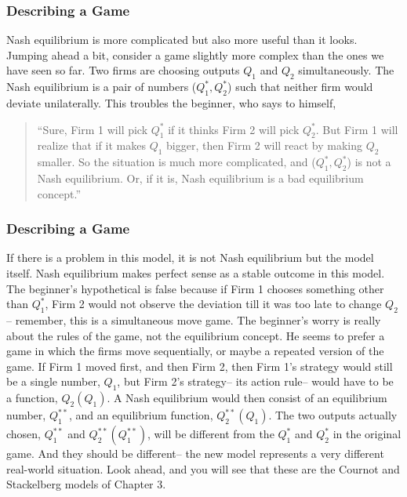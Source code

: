  \begin{frame}[fragile]\frametitle{Describing a Game}
Nash equilibrium  is more complicated  but also more useful than  it looks.
Jumping ahead a bit, consider a game slightly more complex than the ones we have
seen so far.  Two firms are choosing outputs $Q_1$ and  $Q_2$  simultaneously.
The Nash equilibrium is a pair of numbers ($Q_1^*, Q_2^*$) such that neither
firm would deviate unilaterally. This troubles the beginner, who says to
himself, \begin{small} \begin{quotation}
 ``Sure, Firm 1  will pick  $Q_1^*$  if it thinks Firm 2 will pick
$Q_2^*$. But Firm 1  will realize that  if it makes  $Q_1$  bigger, then Firm 2
will react by making  $Q_2$  smaller.  So the situation is much more
complicated, and  ($Q_1^*, Q_2^*$) is not a Nash equilibrium. Or, if it is, Nash
equilibrium is a bad equilibrium concept.''
 \end{quotation} \end{small}
 \end{frame}
 \begin{frame}[fragile]\frametitle{Describing a Game}
   If there is a problem in this model, it is not Nash equilibrium but the model
itself. Nash equilibrium makes perfect sense as a stable outcome  in  this
model. The beginner's hypothetical is false because if Firm 1 chooses something
other than $Q_1^*$, Firm 2 would not   observe the deviation till  it was too
late to change $Q_2$-- remember, this is a simultaneous move game.  The
beginner's worry is really about the rules of the game, not the equilibrium
concept. He seems to prefer a game in which the firms move sequentially, or
maybe a repeated version of the game.  If Firm 1 moved first, and then Firm 2,
then Firm 1's strategy would  still  be a single number, $Q_1$, but Firm 2's
strategy-- its action rule-- would  have to be     a function, $ Q_2(Q_1)$. A
Nash equilibrium would then  consist of an equilibrium number, $Q_1^{**}$, and
an equilibrium function, $Q_2^{**}(Q_1)$. The two outputs actually chosen,
$Q_1^{**}$ and $Q_2^{**} (Q_1^{**})$,   will be different from the  $Q_1^{*}$
and  $Q_2^{*}$ in the original game.  And  they should be different--   the  new
model represents  a very different real-world situation.  Look ahead, and you
will see that these are the Cournot and Stackelberg models of Chapter 3.

\end{frame}
